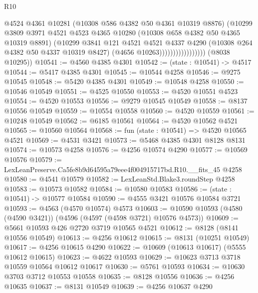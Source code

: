\begin{lexlean}{R10}
\begin{coremodule}
                                  @4524
                                  @4361
                                  @10281
                                  (@10308 @586 @4382 @50 @4361 @10319 @8876)
                                  (@10299
                                    @3809
                                    @3971
                                    @4521
                                    @4523
                                    @4365
                                    @10280
                                    (@10308 @658 @4382 @50 @4365 @10319 @8891)
                                    (@10299
                                      @3841
                                      @121
                                      @4521
                                      @4521
                                      @4337
                                      @4290
                                      (@10308 @264 @4382 @50 @4337 @10319 @8427)
                                      (@4656 @10263)))))))))))))))))
      (@8038 @10295))
@10541 := @4560 @4385 @4301
@10542 := (state : @10541) -> @4517
@10544 := @5417 @4385 @4301
@10545 := @10544 @4258
@10546 := @9275 @10545
@10548 := @5420 @4385 @4301
@10549 := @10548 @4258
@10550 := @10546 @10549
@10551 := @4525 @10550
@10553 := @4520 @10551 @4523
@10554 := @4520 @10553
@10556 := @9279 @10545 @10549
@10558 := @8137 @10556 @10549
@10559 := @10554 @10558
@10560 := @4520 @10559
@10561 := @10248 @10549
@10562 := @6185 @10561
@10564 := @4520 @10562 @4521
@10565 := @10560 @10564
@10568 := fun (state : @10541) => @4520 @10565 @4521
@10569 := @4531 @3421
@10573 := @5468 @4385 @4301 @8128 @8131
@10574 := @10573 @4258
@10576 := @4256 @10574 @4290
@10577 := @10569 @10576
@10579 := LexLeanPreserve.Ca5fe8b9d64595a79eee4f004915717bd.R10.__fits_45 @4258
@10580 := @4541 @10579
@10582 := LexLeanStd.Blake3.roundStep @4258
@10583 := @10573 @10582
@10584 := @10580 @10583
@10586 := (state : @10541) -> @10577 @10584
@10590 := @4555 @3421 @10576 @10584 @3721
@10593 := @4563 (@4570 @10574) @4573
@10603 := @10590 @10593 (@4580 (@4590 @3421)) (@4596 (@4597 (@4598 @3721) @10576 @4573))
@10609 := @5661 @10593 @426 @2720 @3719 @10565 @4521
@10612 := @8128 (@8141 @10556 @10549)
@10613 := @4256 @10612
@10615 := @8131 (@10251 @10549)
@10617 := @4256 @10615 @4290
@10622 := @10609 (@10613 @10617) (@5555 @10612 @10615)
@10623 := @4622 @10593
@10629 := @10623 @3713 @3718 @10559 @10564 @10612 @10617
@10630 := @5761 @10593
@10634 := @10630 @3703 @3712 @10553 @10558
@10635 := @8128 @10556
@10636 := @4256 @10635
@10637 := @8131 @10549
@10639 := @4256 @10637 @4290

\end{coremodule}
\end{lexlean}
